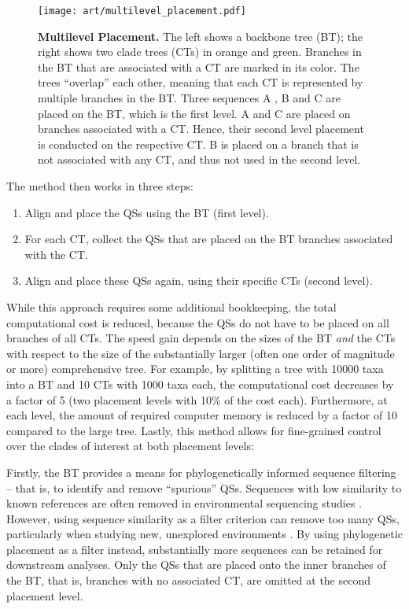 \begin{figure}[hpbt]
    \centering
    \texttt{[image: art/multilevel\_placement.pdf]}
    \caption[Multilevel Placement]{
        \textbf{Multilevel Placement.}
        The left shows a backbone tree (BT); the right shows two clade trees (CTs) in orange and green.
        Branches in the BT that are associated with a CT are marked in its color.
        The trees ``overlap'' each other, meaning that each CT is represented by multiple branches in the BT.
        Three sequences {\sffamily A} , {\sffamily B} and {\sffamily C} are placed on the BT, which is the first level.
        {\sffamily A} and {\sffamily C} are placed on branches associated with a CT.
        Hence, their second level placement is conducted on the respective CT.
        {\sffamily B} is placed on a branch that is not associated with any CT,
        and thus not used in the second level.
    }
    \label{fig:multilevel_placement}
\end{figure}

The method then works in three steps:

\begin{enumerate}
    \item Align and place the \acp{QS} using the \ac{BT} (first level).
    \item For each \ac{CT}, collect the \acp{QS} that are placed on the \ac{BT} branches associated with the \ac{CT}.
    \item Align and place these \acp{QS} again, using their specific \acp{CT} (second level).
\end{enumerate}

While this approach requires some additional bookkeeping,
the total computational cost is reduced,
because the \acp{QS} do not have to be placed on all branches of all \acp{CT}.
The speed gain depends on the sizes of the \ac{BT} \emph{and} the \acp{CT}
with respect to the size of the substantially larger (often one order of magnitude or more) comprehensive tree.
For example, by splitting a tree with \num{10 000} taxa into a \ac{BT} and \num{10} \acp{CT} with 1000 taxa each,
the computational cost decreases by a factor of 5 (two placement levels with 10\% of the cost each).
Furthermore, at each level,
the amount of required computer memory is reduced by a factor of \num{10} compared to the large tree.
Lastly, this method allows for fine-grained control over the clades of interest at both placement levels:

Firstly, the \ac{BT} provides a means for phylogenetically informed sequence filtering --
that is, to identify and remove ``spurious'' \acp{QS}.
Sequences with low similarity to known references are often removed in environmental sequencing studies \citep{Stoeck2010}.
However, using sequence similarity as a filter criterion can remove too many \acp{QS},
particularly when studying new, unexplored environments \citep{Mahe2017}.
By using phylogenetic placement as a filter instead, substantially more sequences can be retained for downstream analyses.
Only the \acp{QS} that are placed onto the inner branches of the \ac{BT},
that is, branches with no associated \ac{CT},
are omitted at the second placement level.

